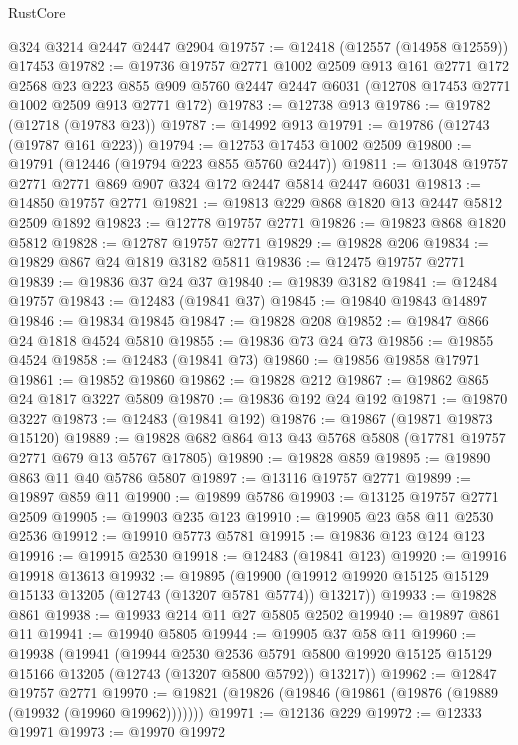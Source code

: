 \begin{lexlean}{RustCore}
\begin{coremodule}
    @324
    @3214
    @2447
    @2447
    @2904
@19757 := @12418 (@12557 (@14958 @12559)) @17453
@19782 := @19736
    @19757
    @2771
    @1002
    @2509
    @913
    @161
    @2771
    @172
    @2568
    @23
    @223
    @855
    @909
    @5760
    @2447
    @2447
    @6031
    (@12708 @17453 @2771 @1002 @2509 @913 @2771 @172)
@19783 := @12738 @913
@19786 := @19782 (@12718 (@19783 @23))
@19787 := @14992 @913
@19791 := @19786 (@12743 (@19787 @161 @223))
@19794 := @12753 @17453 @1002 @2509
@19800 := @19791 (@12446 (@19794 @223 @855 @5760 @2447))
@19811 := @13048 @19757 @2771 @2771 @869 @907 @324 @172 @2447 @5814 @2447 @6031
@19813 := @14850 @19757 @2771
@19821 := @19813 @229 @868 @1820 @13 @2447 @5812 @2509 @1892
@19823 := @12778 @19757 @2771
@19826 := @19823 @868 @1820 @5812
@19828 := @12787 @19757 @2771
@19829 := @19828 @206
@19834 := @19829 @867 @24 @1819 @3182 @5811
@19836 := @12475 @19757 @2771
@19839 := @19836 @37 @24 @37
@19840 := @19839 @3182
@19841 := @12484 @19757
@19843 := @12483 (@19841 @37)
@19845 := @19840 @19843 @14897
@19846 := @19834 @19845
@19847 := @19828 @208
@19852 := @19847 @866 @24 @1818 @4524 @5810
@19855 := @19836 @73 @24 @73
@19856 := @19855 @4524
@19858 := @12483 (@19841 @73)
@19860 := @19856 @19858 @17971
@19861 := @19852 @19860
@19862 := @19828 @212
@19867 := @19862 @865 @24 @1817 @3227 @5809
@19870 := @19836 @192 @24 @192
@19871 := @19870 @3227
@19873 := @12483 (@19841 @192)
@19876 := @19867 (@19871 @19873 @15120)
@19889 := @19828 @682 @864 @13 @43 @5768 @5808 (@17781 @19757 @2771 @679 @13 @5767 @17805)
@19890 := @19828 @859
@19895 := @19890 @863 @11 @40 @5786 @5807
@19897 := @13116 @19757 @2771
@19899 := @19897 @859 @11
@19900 := @19899 @5786
@19903 := @13125 @19757 @2771 @2509
@19905 := @19903 @235 @123
@19910 := @19905 @23 @58 @11 @2530 @2536
@19912 := @19910 @5773 @5781
@19915 := @19836 @123 @124 @123
@19916 := @19915 @2530
@19918 := @12483 (@19841 @123)
@19920 := @19916 @19918 @13613
@19932 := @19895
    (@19900 (@19912 @19920 @15125 @15129 @15133 @13205 (@12743 (@13207 @5781 @5774)) @13217))
@19933 := @19828 @861
@19938 := @19933 @214 @11 @27 @5805 @2502
@19940 := @19897 @861 @11
@19941 := @19940 @5805
@19944 := @19905 @37 @58 @11
@19960 := @19938
    (@19941
      (@19944
        @2530
        @2536
        @5791
        @5800
        @19920
        @15125
        @15129
        @15166
        @13205
        (@12743 (@13207 @5800 @5792))
        @13217))
@19962 := @12847 @19757 @2771
@19970 := @19821 (@19826 (@19846 (@19861 (@19876 (@19889 (@19932 (@19960 @19962)))))))
@19971 := @12136 @229
@19972 := @12333 @19971
@19973 := @19970 @19972

\end{coremodule}
\end{lexlean}
